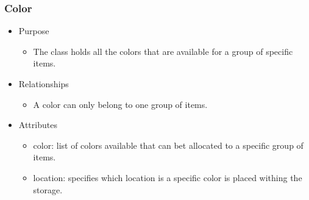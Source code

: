 \documentclass[hidelinks, 12pt, a4paper]{article}
\begin{document}
\begin{itemize}
    \subsubsection{Color}
    \begin{itemize}
        \item Purpose
        \begin{itemize}
            \item The class holds all the colors that are available for a group of specific items.
        \end{itemize}
        \item Relationships
        \begin{itemize}
            \item A color can only belong to one group of items.
        \end{itemize}
        \item Attributes
        \begin{itemize}
            \item color: list of colors available that can bet allocated to a specific group of items.
            \item location: specifies which location is a specific color is placed withing the storage.
        \end{itemize}
    \end{itemize}



\end{itemize}
\end{document}
